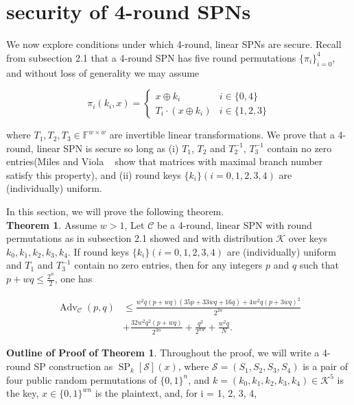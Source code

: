 

\section{security of 4-round SPNs}
\label{section:security of 4-round SPNs}

We now explore conditions under which 4-round, linear SPNs are secure. Recall from subsection 2.1 that a 4-round SPN has five round permutations $\{\pi_i\}_{i=0}^4$, and without loss of generality we may assume

$$
\pi_{i}\left(k_{i}, x\right)=\left\{\begin{array}{ll}
{x \oplus k_{i}} & {i \in\{0,4\}} \\
{T_{i} \cdot\left(x \oplus k_{i}\right)} & {i \in\{1,2,3\}}
\end{array}\right.
$$

where $T_{1}, T_{2}, T_{3} \in \mathbb{F}^{w \times w}$ are invertible linear transformations. We prove that a 4-round, linear SPN is secure so long as (i) $T_1$, $T_2$ and $T_{2}^{-1}$, $T_{3}^{-1}$ contain no zero entries(Miles and Viola ~\cite{miles2015substitution} show that matrices with maximal branch number ~\cite{daemen1995cipher} satisfy this property), and (ii) round keys $\{k_i\}(i=0, 1, 2, 3, 4)$ are (individually) uniform.

In this section, we will prove the following theorem.\\

\noindent
\textbf{Theorem 1}. Assume $w>1$, Let $\mathcal{C}$ be a 4-round, linear SPN with round permutations as in subsection 2.1 showed and with distribution $\mathcal{K}$ over keys $k_{0}, k_{1}, k_{2}, k_{3}, k_{4}$. If round keys $\{k_i\}(i=0, 1, 2, 3, 4)$ are (individually) uniform and $T_1$ and $T_{3}^{-1}$ contain no zero entries, then for any integers $\mathit{p}$ and $\mathit{q}$ such that $p+wq \leq \frac{2^n}{2}$, one has

\begin{equation}
\begin{aligned}
\operatorname{Adv}_{\mathcal{C}}\left(p, q\right) &\leq \frac{w^2q(p+wq)(35p+33wq+16q)+4w^2q(p+3wq)^2}{2^{2n}} \\
&+ \frac{32 w^2 q^2 (p+w q)}{2^{3n}}+\frac{q^2}{2^{nw}} + \frac{w^2 q}{N}.
\end{aligned}
\end{equation}

\noindent \textbf{Outline of Proof of Theorem 1}. Throughout the proof, we will write a 4-round SP construction as $\operatorname{SP}_{k}[\mathcal{S}](x)$, where $\mathcal{S}=(S_1, S_2, S_3, S_4)$  is a pair of four public random permutations of $\{0,1\}^{n}$, and $k = (k_{0}, k_{1}, k_{2}, k_{3}, k_{4}) \in \mathcal{K}^{5}$ is the key, $x \in \{0,1\}^{w n}$ is the plaintext, and, for i = 1, 2, 3, 4,


